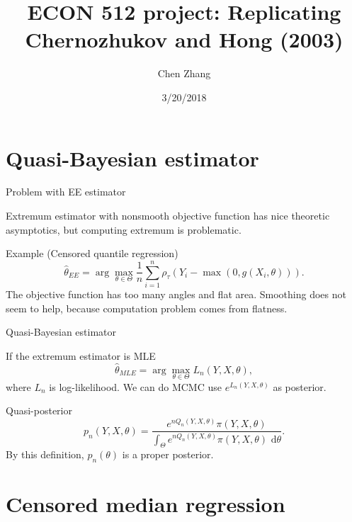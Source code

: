 \documentclass{beamer}
\title[ECON 512]{ECON 512 project: Replicating Chernozhukov and Hong (2003)}
\author{Chen Zhang}
\date{3/20/2018}
\begin{document}
\begin{frame}
  \titlepage
\end{frame}


\section{Quasi-Bayesian estimator}

\begin{frame}{Problem with EE estimator}


Extremum estimator with nonsmooth objective function has nice theoretic asymptotics, but computing extremum is problematic.
\vskip 0.5cm
\begin{block}{Example (Censored quantile regression)}
    \begin{equation*}
        \hat{\theta}_{EE} = \arg\max_{\theta\in\Theta}\frac{1}{n}\sum\limits_{i=1}^n\rho_{\tau}(Y_i-\max(0,g(X_i,\theta))).
    \end{equation*}
    The objective function has too many angles and flat area. Smoothing does not seem to help, because computation problem comes from flatness.
\end{block}

\end{frame}

\begin{frame}{Quasi-Bayesian estimator}

    If the extremum estimator is MLE
    \begin{equation*}
        \hat{\theta}_{MLE} = \arg\max_{\theta\in\Theta}L_n(Y,X,\theta), 
    \end{equation*}
    where $L_n$ is log-likelihood. We can do MCMC use $e^{L_n(Y,X,\theta)}$ as posterior.
\begin{block}{Quasi-posterior}
    \begin{equation*} p_n(Y,X,\theta)=\frac{e^{nQ_n(Y,X,\theta)}\pi(Y,X,\theta)}{\int_{\Theta}e^{nQ_n(Y,X,\theta)}\pi(Y,X,\theta)\mbox{ d}\theta }.
    \end{equation*}
    By this definition, $p_n(\theta)$ is a proper posterior.
\end{block}

\end{frame}


\section{Censored median regression}
\end{document}
